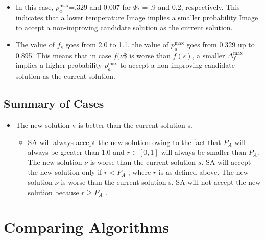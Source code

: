 \documentclass[
  letterpaper,
  DIV=11,
  numbers=noendperiod]{scrreprt}
\providecommand{\tightlist}{%
  \setlength{\itemsep}{0pt}\setlength{\parskip}{0pt}}\usepackage{longtable,booktabs,array}
\begin{document}
\begin{itemize}
\tightlist
\item
  In this case, \(p_a^{\text{max}}\)=.329 and 0.007 for \({\Psi_t}\) =
  .9 and 0.2, respectively. This indicates that a lower temperature
  Image implies a smaller probability Image to accept a non-improving
  candidate solution as the current solution.
\item
  The value of \(f_s\) goes from 2.0 to 1.1, the value of
  \(p_a^{\text{max}}\) goes from 0.329 up to 0.895. This means that in
  case \(f(\nu\)\$ is worse than \(f(s)\), a smaller
  \(\Delta_f^{\text{max}}\) implies a higher probability
  \(p_a^{\text{max}}\) to accept a non-improving candidate solution as
  the current solution.
\end{itemize}

\subsection{Summary of Cases}\label{summary-of-cases}

\begin{itemize}
\tightlist
\item
  The new solution v is better than the current solution s.

  \begin{itemize}
  \tightlist
  \item
    SA will always accept the new solution owing to the fact that
    \(P_A\) will always be greater than 1.0 and \(r \in [0,1]\) will
    always be smaller than \(P_A\). The new solution \(\nu\) is worse
    than the current solution \(s\). SA will accept the new solution
    only if \(r < P_A\) , where \(r\) is as defined above. The new
    solution \(\nu\) is worse than the current solution s. SA will not
    accept the new solution because \(r \geq P_A\) .
  \end{itemize}
\end{itemize}

\section{Comparing Algorithms}\label{comparing-algorithms}
\end{document}
